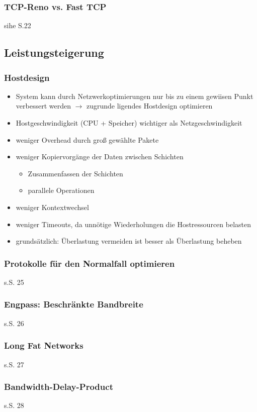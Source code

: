 \subsubsection{TCP-Reno vs. Fast TCP}
sihe S.22
\subsection{Leistungsteigerung}
\subsubsection{Hostdesign}
\begin{itemize}
	\item System kann durch Netzwerkoptimierungen nur bis zu einem gewiisen Punkt verbessert werden $\to$ zugrunde ligendes Hostdesign optimieren
	\item Hostgeschwindigkeit (CPU + Speicher) wichtiger als Netzgeschwindigkeit
	\item weniger Overhead durch groß gewählte Pakete
	\item weniger Kopiervorgänge der Daten zwischen Schichten
	\begin{itemize}
		\item Zusammenfassen der Schichten
		\item parallele Operationen
	\end{itemize}
	\item weniger Kontextwechsel
	\item weniger Timeouts, da unnötige Wiederholungen die Hostressourcen belasten
	\item grundsätzlich: Überlastung vermeiden ist besser als Überlastung beheben	
	\end{itemize}
\subsubsection{Protokolle für den Normalfall optimieren}
s.S. 25
\subsubsection{Engpass: Beschränkte Bandbreite}
s.S. 26
\subsubsection{Long Fat Networks}
s.S. 27
\subsubsection{Bandwidth-Delay-Product}
s.S. 28
